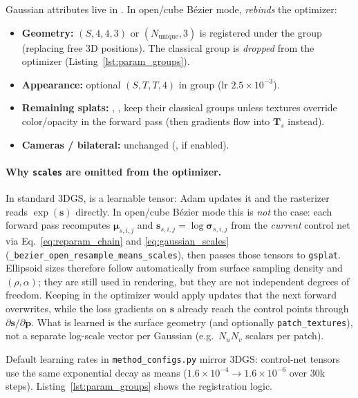 Gaussian attributes live in . In open/cube B\'ezier mode,  \emph{rebinds} the optimizer:
\begin{itemize}
    \item \textbf{Geometry:}  $(S,4,4,3)$ or  $(N_{\mathrm{unique}},3)$ is registered under the  group (replacing free 3D positions). The classical  group is \emph{dropped} from the optimizer (Listing~\ref{lst:param_groups}).
    \item \textbf{Appearance:} optional  $(S,T,T,4)$ in group  (lr $2.5\times 10^{-3}$).
    \item \textbf{Remaining splats:} , ,  keep their classical groups unless textures override color/opacity in the forward pass (then gradients flow into $\mathbf{T}_s$ instead).
    \item \textbf{Cameras / bilateral:} unchanged (,  if enabled).
\end{itemize}

\paragraph{Why \texttt{scales} are omitted from the optimizer.}
In standard 3DGS,  is a learnable tensor: Adam updates it and the rasterizer reads $\exp(\mathbf{s})$ directly. In open/cube B\'ezier mode this is \emph{not} the case: each forward pass recomputes $\boldsymbol{\mu}_{s,i,j}$ and $\mathbf{s}_{s,i,j}=\log\boldsymbol{\sigma}_{s,i,j}$ from the \emph{current} control net via Eq.~\eqref{eq:reparam_chain} and \eqref{eq:gaussian_scales} (\texttt{\_bezier\_open\_resample\_means\_scales}), then passes those tensors to \texttt{gsplat}. Ellipsoid sizes therefore follow automatically from surface sampling density and $(\rho,\alpha)$; they are still used in rendering, but they are not independent degrees of freedom. Keeping  in the optimizer would apply updates that the next forward overwrites, while the loss gradients on $\mathbf{s}$ already reach the control points through $\partial\mathbf{s}/\partial\mathbf{p}$. What is learned is the surface geometry (and optionally \texttt{patch\_textures}), not a separate log-scale vector per Gaussian (e.g.\ $N_u N_v$ scalars per patch).

Default learning rates in \texttt{method\_configs.py} mirror 3DGS: control-net tensors use the same exponential decay as means ($1.6\times 10^{-4}\rightarrow 1.6\times 10^{-6}$ over 30k steps). Listing~\ref{lst:param_groups} shows the registration logic.

